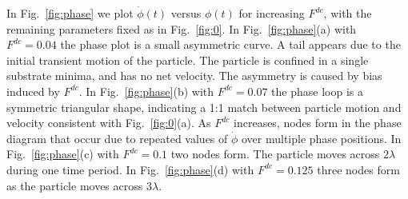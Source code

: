 \documentclass[twocolumn,preprintnumbers,amsmath,amssymb,aps,prx]{revtex4}
\begin{document}
  In Fig.~\ref{fig:phase}
  we plot $\dot{\phi}(t)$ versus $\phi(t)$
  for increasing %
  $F^{dc}$, %
  with the remaining parameters fixed as in Fig.~\ref{fig:0}.
  In Fig.~\ref{fig:phase}(a) with
  $F^{dc} = 0.04$
  the phase plot is a small asymmetric curve.
  A tail appears
  due to the initial transient
  motion of the particle.
  The particle is confined in a single
  substrate minima,
  and has no net velocity.
  The asymmetry is caused by bias induced by $F^{dc}$.
  In Fig.~\ref{fig:phase}(b)
  with $F^{dc} = 0.07$
  the phase loop is a symmetric triangular shape,
  indicating a 1:1 match between
  particle motion and velocity consistent with 
  Fig.~\ref{fig:0}(a).
  As $F^{dc}$ %
  increases,
  nodes form in the phase diagram
  that occur due to repeated values
  of $\dot{\phi}$ over multiple phase positions.
  In Fig.~\ref{fig:phase}(c)
  with $F^{dc} = 0.1$
  two nodes form.
  The particle moves across $2\lambda$
  during one time period.
  In Fig.~\ref{fig:phase}(d)
  with $F^{dc} = 0.125$
  three nodes form as the particle moves across $3\lambda$.
\end{document}
